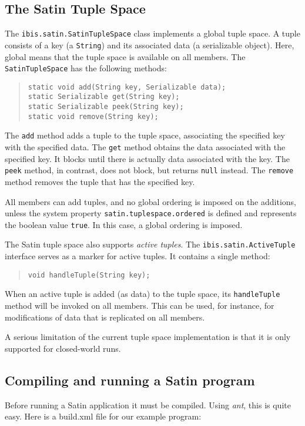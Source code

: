 \documentclass[10pt]{article}
\newcommand{\mysubsection}[1]{\subsection{#1}\label{#1}}
\begin{document}
\mysubsection{The Satin Tuple Space}

The \verb+ibis.satin.SatinTupleSpace+ class implements a global tuple
space.  A tuple consists of a key (a \texttt{String}) and its associated
data (a serializable object). Here, global means that the tuple space is
available on all members. The \verb+SatinTupleSpace+ has the following
methods:

\begin{quote}
\begin{verbatim}
static void add(String key, Serializable data);
static Serializable get(String key);
static Serializable peek(String key);
static void remove(String key);
\end{verbatim}
\end{quote}

The \verb+add+ method adds a tuple to the tuple space, associating the
specified key with the specified data.
The \verb+get+ method obtains the data associated with the specified key.
It blocks until there is actually data associated with the key.
The \verb+peek+ method, in contrast, does not block, but returns
\verb+null+ instead.
The \verb+remove+ method removes the tuple that has the specified key.

All members can add tuples, and no global ordering is imposed on the
additions, unless the system property
\verb+satin.tuplespace.ordered+ is defined and represents the
boolean value \verb+true+. In this case, a global ordering is imposed.

The Satin tuple space also supports \emph{active tuples}.
The \verb+ibis.satin.ActiveTuple+ interface serves
as a marker for active tuples. It contains a single method:

\begin{quote}
\begin{verbatim}
void handleTuple(String key);
\end{verbatim}
\end{quote}

When an active tuple is added (as data) to the tuple space,
its \verb+handleTuple+ method will be invoked on all members.
This can be used, for instance, for modifications of data that
is replicated on all members.

A serious limitation of the current tuple space implementation is that
it is only supported for closed-world runs.

\mysubsection{Compiling and running a Satin program}

Before running a Satin application it must be compiled.
Using \emph{ant}, this is quite easy. Here is a build.xml file for
our example program:
\end{document}
